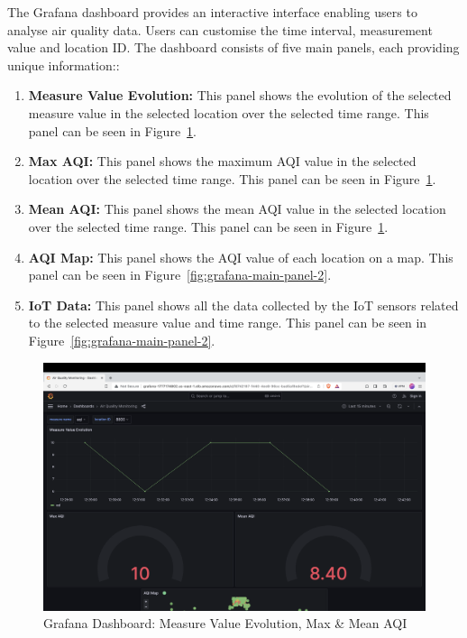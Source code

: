 \documentclass[12pt,oneside]{book} %
\begin{document}
The Grafana dashboard provides an interactive interface enabling users to
analyse air quality data. Users can customise the time interval, measurement
value and location ID. The dashboard consists of five main panels, each
providing unique information::
\begin{enumerate}
    \item \textbf{Measure Value Evolution:} This panel shows the evolution of the selected measure value in the selected location over the selected time range. This panel can be seen in Figure~\ref{fig:grafana-main-panel-1}.
    \item \textbf{Max AQI:} This panel shows the maximum AQI value in the selected location over the selected time range. This panel can be seen in Figure~\ref{fig:grafana-main-panel-1}.
    \item \textbf{Mean AQI:} This panel shows the mean AQI value in the selected location over the selected time range. This panel can be seen in Figure~\ref{fig:grafana-main-panel-1}.
    \item \textbf{AQI Map:} This panel shows the AQI value of each location on a map. This panel can be seen in Figure~\ref{fig:grafana-main-panel-2}.
    \item \textbf{IoT Data:} This panel shows all the data collected by the IoT sensors related to the selected measure value and time range. This panel can be seen in Figure~\ref{fig:grafana-main-panel-2}.
\end{enumerate}

\begin{figure}[H]
    \centering
    \includegraphics[width=1\linewidth]{images/grafana-1.png}
    \caption{Grafana Dashboard: Measure Value Evolution, Max \& Mean AQI}\label{fig:grafana-main-panel-1}
\end{figure}
\end{document}
